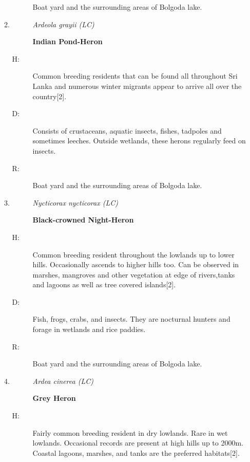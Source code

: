 \begin{itemize}
\begin{enumerate}
\begin{description}
Boat yard and the surrounding areas of Bolgoda lake.%
\end{description}%
\item%
\begin{description}%
\item[]%
\textit{Ardeola grayii (LC)}%
\item[]%
\textbf{Indian Pond{-}Heron}%
\end{description}%
\begin{description}%
\item[H: ]%
 Common breeding residents that can be found all throughout Sri Lanka and numerous winter migrants appear to arrive all over the country{[}2{]}.%
\item[D: ]%
Consists of crustaceans, aquatic insects, fishes, tadpoles and sometimes leeches. Outside wetlands, these herons regularly feed on insects.%
\item[R: ]%
Boat yard and the surrounding areas of Bolgoda lake.%
\end{description}%
\item%
\begin{description}%
\item[]%
\textit{Nycticorax nycticorax (LC)}%
\item[]%
\textbf{Black{-}crowned Night{-}Heron}%
\end{description}%
\begin{description}%
\item[H: ]%
Common breeding resident throughout the lowlands  up to lower hills. Occasionally ascends to higher hills too. Can be observed in marshes, mangroves and other vegetation at edge of rivers,tanks and lagoons as well as tree covered islands{[}2{]}.%
\item[D: ]%
Fish, frogs, crabs, and insects. They are nocturnal hunters and forage in wetlands and rice paddies.%
\item[R: ]%
Boat yard and the surrounding areas of Bolgoda lake.%
\end{description}%
\item%
\begin{description}%
\item[]%
\textit{Ardea cinerea (LC)}%
\item[]%
\textbf{Grey Heron}%
\end{description}%
\begin{description}%
\item[H: ]%
Fairly common breeding resident in dry lowlands. Rare in wet lowlands. Occasional records are present at high hills up to 2000m. Coastal lagoons, marshes, and tanks are the preferred habitats{[}2{]}.%

\end{description}
\end{enumerate}
\end{itemize}
